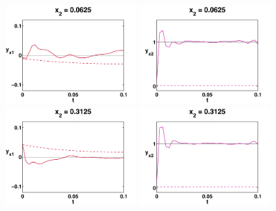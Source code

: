 \documentclass[a4paper,10pt,BCOR=15mm]{scrbook}
\begin{document}
\begin{figure}
\centering
 \begin{minipage}[b]{5cm}
    \includegraphics[width=5cm]{pics/fullOpti/new/x2_sigx2_1.pdf}  
  \end{minipage}
 \begin{minipage}[b]{5cm}
    \includegraphics[width=5cm]{pics/fullOpti/new/x2_sigx22_1.pdf}  
  \end{minipage}
\vspace{0.3cm}
 \begin{minipage}[b]{5cm}
    \includegraphics[width=5cm]{pics/fullOpti/new/x2_sigx2_2.pdf}  
  \end{minipage}
 \begin{minipage}[b]{5cm}
    \includegraphics[width=5cm]{pics/fullOpti/new/x2_sigx22_2.pdf}  
  \end{minipage}
\vspace{0.3cm}
 \begin{minipage}[b]{5cm}

\end{minipage}
\end{figure}
\end{document}
